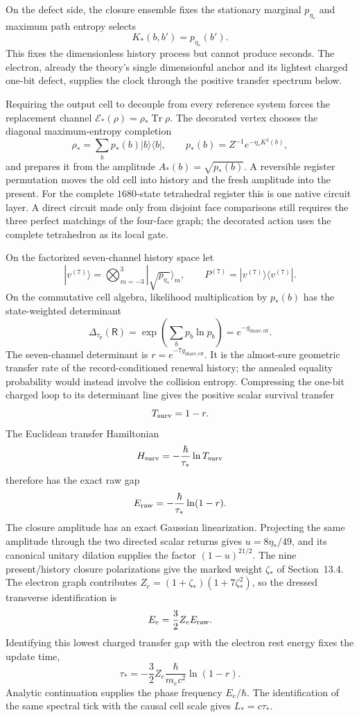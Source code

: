 \documentclass[11pt]{article}
\begin{document}
On the defect side, the closure ensemble fixes the stationary marginal $p_{\eta_*}$ and maximum path entropy selects
\[
K_*(b,b')=p_{\eta_*}(b').
\]
This fixes the dimensionless history process but cannot produce seconds. The electron, already the theory's single dimensionful anchor and its lightest charged one-bit defect, supplies the clock through the positive transfer spectrum below.

Requiring the output cell to decouple from every reference system forces the replacement channel $\mathcal E_*(\rho)=\rho_*\operatorname{Tr}\rho$. The decorated vertex chooses the diagonal maximum-entropy completion
\[
\rho_*=\sum_b p_*(b)|b\rangle\langle b|,
\qquad
p_*(b)=Z^{-1}e^{-\eta_*K^2(b)},
\]
and prepares it from the amplitude $A_*(b)=\sqrt{p_*(b)}$. A reversible register permutation moves the old cell into history and the fresh amplitude into the present. For the complete $1680$-state tetrahedral register this is one native circuit layer. A direct circuit made only from disjoint face comparisons still requires the three perfect matchings of the four-face graph; the decorated action uses the complete tetrahedron as its local gate.

On the factorized seven-channel history space let
\[
|v^{(7)}\rangle=\bigotimes_{m=-3}^{3}|\sqrt{p_{\eta_*}}\rangle_m,
\qquad
P^{(7)}=|v^{(7)}\rangle\langle v^{(7)}|.
\]
On the commutative cell algebra, likelihood multiplication by $p_*(b)$ has the state-weighted determinant
\[
\Delta_{\tau_p}(\mathsf R)
=\exp\!\left(\sum_bp_b\ln p_b\right)
=e^{-g_{\mathrm{share,eff}}}.
\]
The seven-channel determinant is $r=e^{-7g_{\mathrm{share,eff}}}$. It is the almost-sure geometric transfer rate of the record-conditioned renewal history; the annealed equality probability would instead involve the collision entropy. Compressing the one-bit charged loop to its determinant line gives the positive scalar survival transfer
\[
T_{\rm surv}=1-r.
\]
The Euclidean transfer Hamiltonian
\[
H_{\rm surv}=-\frac{\hbar}{\tau_*}\ln T_{\rm surv}
\]
therefore has the exact raw gap
\[
E_{\rm raw}=-\frac{\hbar}{\tau_*}\ln(1-r).
\]
The closure amplitude has an exact Gaussian linearization. Projecting the same amplitude through the two directed scalar returns gives $u=8\eta_*/49$, and its canonical unitary dilation supplies the factor $(1-u)^{21/2}$. The nine present/history closure polarizations give the marked weight $\zeta_*$ of Section~13.4. The electron graph contributes $Z_e=(1+\zeta_*)(1+7\zeta_*^2)$, so the dressed transverse identification is
\[
E_e=\frac32Z_eE_{\rm raw}.
\]
Identifying this lowest charged transfer gap with the electron rest energy fixes the update time,
\[
\boxed{
\tau_*=-\frac32Z_e\frac{\hbar}{m_ec^2}\ln(1-r)
}.
\]
Analytic continuation supplies the phase frequency $E_e/\hbar$. The identification of the same spectral tick with the causal cell scale gives $L_*=c\tau_*$.
\end{document}
